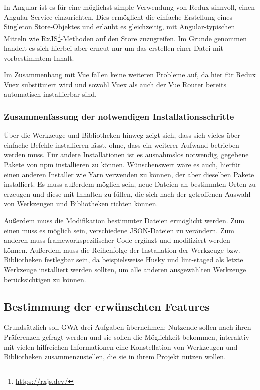 In Angular ist es für eine möglichst simple Verwendung von Redux sinnvoll, einen Angular-Service einzurichten. Dies ermöglicht die einfache Erstellung eines Singleton Store-Objektes und erlaubt es gleichzeitig, mit Angular-typischen Mitteln wie RxJS\footnote{\url{https://rxjs.dev/}}-Methoden auf den Store zuzugreifen. Im Grunde genommen handelt es sich hierbei aber erneut nur um das erstellen einer Datei mit vorbestimmtem Inhalt.

Im Zusammenhang mit Vue fallen keine weiteren Probleme auf, da hier für Redux Vuex substituiert wird und sowohl Vuex als auch der Vue Router bereits automatisch installierbar sind.

\subsubsection{Zusammenfassung der notwendigen Installationsschritte}
Über die Werkzeuge und Bibliotheken hinweg zeigt sich, dass sich vieles über einfache Befehle installieren lässt, ohne, dass ein weiterer Aufwand betrieben werden muss. Für andere Installationen ist es ausnahmslos notwendig, gegebene Pakete von \gls{npm} installieren zu können. Wünschenswert wäre es auch, hierfür einen anderen Installer wie Yarn verwenden zu können, der aber dieselben Pakete installiert. Es muss außerdem möglich sein, neue Dateien an bestimmten Orten zu erzeugen und diese mit Inhalten zu füllen, die sich nach der getroffenen Auswahl von Werkzeugen und Bibliotheken richten können.

Außerdem muss die Modifikation bestimmter Dateien ermöglicht werden. Zum einen muss es möglich sein, verschiedene \gls{JSON}-Dateien zu verändern. Zum anderen muss frameworkspezifischer Code ergänzt und modifiziert werden können. Außerdem muss die Reihenfolge der Installation der Werkzeuge bzw. Bibliotheken festlegbar sein, da beispielsweise Husky und lint-staged als letzte Werkzeuge installiert werden sollten, um alle anderen ausgewählten Werkzeuge berücksichtigen zu können.

\subsection{Bestimmung der erwünschten Features}
\label{konz:all_features}
Grundsätzlich soll \gls{GWA} drei Aufgaben übernehmen: Nutzende sollen nach ihren Präferenzen gefragt werden und sie sollen die Möglichkeit bekommen, interaktiv mit vielen hilfreichen Informationen eine Konstellation von Werkzeugen und Bibliotheken zusammenzustellen, die sie in ihrem Projekt nutzen wollen.

